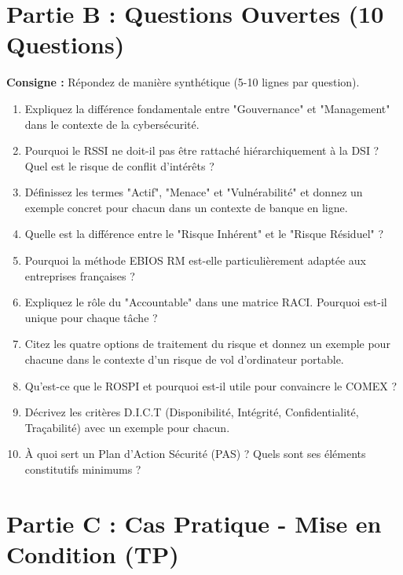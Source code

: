 \section{Partie B : Questions Ouvertes (10 Questions)}

\textbf{Consigne :} Répondez de manière synthétique (5-10 lignes par question).

\begin{enumerate}
    \item Expliquez la différence fondamentale entre "Gouvernance" et "Management" dans le contexte de la cybersécurité.
    \item Pourquoi le RSSI ne doit-il pas être rattaché hiérarchiquement à la DSI ? Quel est le risque de conflit d'intérêts ?
    \item Définissez les termes "Actif", "Menace" et "Vulnérabilité" et donnez un exemple concret pour chacun dans un contexte de banque en ligne.
    \item Quelle est la différence entre le "Risque Inhérent" et le "Risque Résiduel" ?
    \item Pourquoi la méthode EBIOS RM est-elle particulièrement adaptée aux entreprises françaises ?
    \item Expliquez le rôle du "Accountable" dans une matrice RACI. Pourquoi est-il unique pour chaque tâche ?
    \item Citez les quatre options de traitement du risque et donnez un exemple pour chacune dans le contexte d'un risque de vol d'ordinateur portable.
    \item Qu'est-ce que le ROSPI et pourquoi est-il utile pour convaincre le COMEX ?
    \item Décrivez les critères D.I.C.T (Disponibilité, Intégrité, Confidentialité, Traçabilité) avec un exemple pour chacun.
    \item À quoi sert un Plan d'Action Sécurité (PAS) ? Quels sont ses éléments constitutifs minimums ?
\end{enumerate}

\section{Partie C : Cas Pratique - Mise en Condition (TP)}

